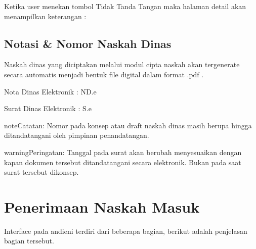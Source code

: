 \documentclass[letterpaper,10pt,bahasai]{sphinxmanual}
\begin{document}
\noindent{}

Ketika user menekan tombol Tidak Tanda Tangan maka halaman detail akan menampilkan keterangan :

\noindent{}


\section{Notasi \& Nomor Naskah Dinas}
\label{\detokenize{ciptanaskah:notasi-nomor-naskah-dinas}}
Naskah dinas yang diciptakan melalui modul cipta naskah akan ter\sphinxhyphen{}generate secara automatis menjadi bentuk file digital
dalam format .pdf .

\begin{DUlineblock}{0em}
\item[] Nota Dinas Elektronik         : ND.e
\item[] 
\end{DUlineblock}

\begin{DUlineblock}{0em}
\item[] Surat Dinas Elektronik        : S.e
\item[] 
\end{DUlineblock}

\begin{sphinxadmonition}{note}{Catatan:}
Nomor pada konsep atau draft naskah dinas masih berupa  hingga ditandatangani oleh pimpinan penandatangan.
\end{sphinxadmonition}

\begin{sphinxadmonition}{warning}{Peringatan:}
Tanggal pada surat akan berubah menyesuaikan dengan kapan dokumen tersebut ditandatangani secara elektronik. Bukan pada saat surat tersebut dikonsep.
\end{sphinxadmonition}


\chapter{Penerimaan Naskah Masuk}
\label{\detokenize{agendaSurat:penerimaan-naskah-masuk}}\label{\detokenize{agendaSurat::doc}}
Interface pada andieni terdiri dari beberapa bagian, berikut adalah penjelasan bagian tersebut.
\end{document}
